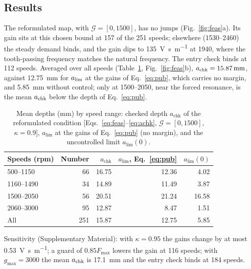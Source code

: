 \subsection{Results}\label{sec:feas-res}

The reformulated map, with $\mathcal G=[0,1500]$, has no jumps (Fig.~\ref{fig:feas}a). Its gain sits at this chosen bound at 157 of the 251 speeds; elsewhere (1530--\SI{2460}{\rpm}) the steady demand binds, and the gain dips to \SI{135}{\volt\second\per\metre} at \SI{1940}{\rpm}, where the tooth-passing frequency matches the natural frequency. The entry check binds at 112 speeds. Averaged over all speeds (Table~\ref{tab:feas}, Fig.~\ref{fig:feas}b), $a_{\mathrm{chk}}=\SI{15.87}{\milli\metre}$, against \SI{12.75}{\milli\metre} for $a_{\lim}$ at the gains of Eq.~\eqref{eq:pub}, which carries no margin, and \SI{5.85}{\milli\metre} without control; only at 1500--\SI{2050}{\rpm}, near the forced resonance, is the mean $a_{\mathrm{chk}}$ below the depth of Eq.~\eqref{eq:pub}.

\begin{table}[!tbp]
  \centering
  \caption{Mean depths (\si{\milli\metre}) by speed range: checked depth $a_{\mathrm{chk}}$ of the reformulated condition [Eqs.~\eqref{eq:feas}--\eqref{eq:achk}, $\mathcal G=[0,1500]$, $\kappa=0.9$], $a_{\lim}$ at the gains of Eq.~\eqref{eq:pub} (no margin), and the uncontrolled limit $a_{\lim}(0)$.}
  \label{tab:feas}
  \begin{tabular}{@{}lrrrr@{}}
    \toprule
    Speeds (rpm) & Number & $a_{\mathrm{chk}}$ & $a_{\lim}$, Eq.~\eqref{eq:pub} & $a_{\lim}(0)$\\
    \midrule
    500--1150  & 66  & 16.75 & 12.36 & 4.02\\
    1160--1490 & 34  & 14.89 & 11.49 & 3.87\\
    1500--2050 & 56  & 20.51 & 21.24 & 16.58\\
    2060--3000 & 95  & 12.87 & 8.47  & 1.51\\
    All        & 251 & 15.87 & 12.75 & 5.85\\
    \bottomrule
  \end{tabular}
  \par\smallskip
  \parbox{0.9\linewidth}{\footnotesize Sensitivity (Supplementary Material): with $\kappa=0.95$ the gains change by at most \SI{0.53}{\volt\second\per\metre}; a guard of $0.85F_{\max}$ lowers the gain at 116 speeds; with $g_{\max}=3000$ the mean $a_{\mathrm{chk}}$ is \SI{17.1}{\milli\metre} and the entry check binds at 184 speeds.}
\end{table}

